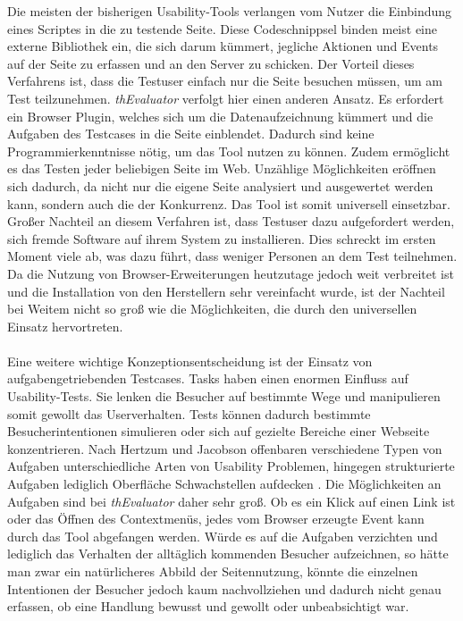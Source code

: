 Die meisten der bisherigen Usability-Tools verlangen vom Nutzer die Einbindung eines Scriptes in die zu testende Seite. Diese Codeschnippsel binden meist eine externe Bibliothek ein, die sich darum kümmert, jegliche Aktionen und Events auf der Seite zu erfassen und an den Server zu schicken. Der Vorteil dieses Verfahrens ist, dass die Testuser einfach nur die Seite besuchen müssen, um am Test teilzunehmen. \textit{thEvaluator} verfolgt hier einen anderen Ansatz. Es erfordert ein Browser Plugin, welches sich um die Datenaufzeichnung kümmert und die Aufgaben des Testcases in die Seite einblendet. Dadurch sind keine Programmierkenntnisse nötig, um das Tool nutzen zu können. Zudem ermöglicht es das Testen jeder beliebigen Seite im Web. Unzählige Möglichkeiten eröffnen sich dadurch, da nicht nur die eigene Seite analysiert und ausgewertet werden kann, sondern auch die der Konkurrenz. Das Tool ist somit universell einsetzbar. Großer Nachteil an diesem Verfahren ist, dass Testuser dazu aufgefordert werden, sich fremde Software auf ihrem System zu installieren. Dies schreckt im ersten Moment viele ab, was dazu führt, dass weniger Personen an dem Test teilnehmen. Da die Nutzung von Browser-Erweiterungen heutzutage jedoch weit verbreitet ist und die Installation von den Herstellern sehr vereinfacht wurde, ist der Nachteil bei Weitem nicht so groß wie die Möglichkeiten, die durch den universellen Einsatz hervortreten.\\
\\
Eine weitere wichtige Konzeptionsentscheidung ist der Einsatz von aufgabengetriebenden Testcases. Tasks haben einen enormen Einfluss auf Usability-Tests. Sie lenken die Besucher auf bestimmte Wege und manipulieren somit gewollt das Userverhalten. Tests können dadurch bestimmte Besucherintentionen simulieren oder sich auf gezielte Bereiche einer Webseite konzentrieren. Nach Hertzum und Jacobson offenbaren verschiedene Typen von Aufgaben unterschiedliche Arten von Usability Problemen, hingegen strukturierte Aufgaben lediglich Oberfläche Schwachstellen aufdecken \cite{anzahlTestpersonen}. Die Möglichkeiten an Aufgaben sind bei \textit{thEvaluator} daher sehr groß. Ob es ein Klick auf einen Link ist oder das Öffnen des Contextmenüs, jedes vom Browser erzeugte Event kann durch das Tool abgefangen werden. Würde es auf die Aufgaben verzichten und lediglich das Verhalten der alltäglich kommenden Besucher aufzeichnen, so hätte man zwar ein natürlicheres Abbild der Seitennutzung, könnte die einzelnen Intentionen der Besucher jedoch kaum nachvollziehen und dadurch nicht genau erfassen, ob eine Handlung bewusst und gewollt oder unbeabsichtigt war.\\
